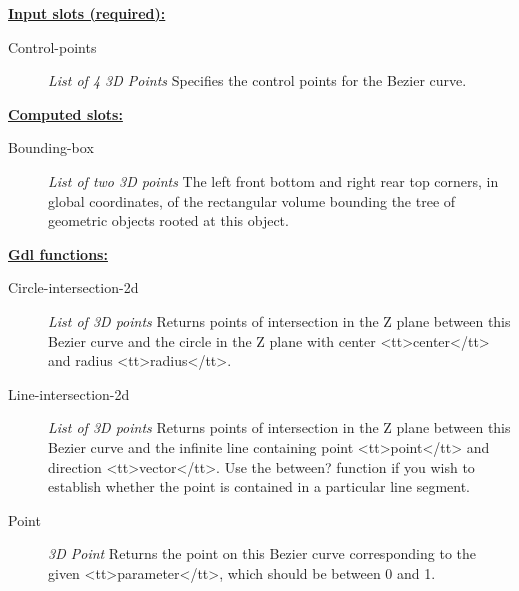 \documentclass [11pt]{book}
\begin{document}
\begin{itemize}
\begin{figure}
\label{fig:bezier-curve}

\end{figure}





\textbf{
\underline{Input slots (required):}}

\begin{description}

\item [Control-points]
\emph{List of 4 3D Points} Specifies the control points for the Bezier curve.


\end{description}






\textbf{
\underline{Computed slots:}}

\begin{description}

\item [Bounding-box]
\emph{List of two 3D points} The left front bottom and right rear top corners, in global coordinates,
of the rectangular volume bounding the tree of geometric objects rooted at this object.


\end{description}






\textbf{
\underline{Gdl functions:}}

\begin{description}

\item [Circle-intersection-2d]
\emph{List of 3D points} Returns points of intersection in the Z plane between this Bezier curve and
the circle in the Z plane with center <tt>center</tt> and radius <tt>radius</tt>.


\item [Line-intersection-2d]
\emph{List of 3D points} Returns points of intersection in the Z plane between this Bezier curve
and the infinite line containing point <tt>point</tt> and direction <tt>vector</tt>. Use the
between? function if you wish to establish whether the point is contained in a particular line
segment.


\item [Point]
\emph{3D Point} Returns the point on this Bezier curve corresponding to the given <tt>parameter</tt>,
which should be between 0 and 1.



\end{description}
\end{itemize}
\end{document}
